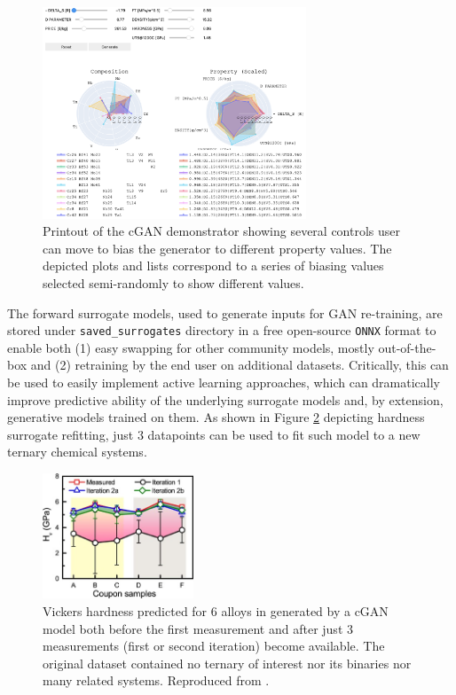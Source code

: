 \begin{figure}[H]
    \centering
    \includegraphics[width=0.7\textwidth]{inversedesign/cgan_demo.png}
    \caption{Printout of the cGAN demonstrator showing several controls user can move to bias the generator to different property values. The depicted plots and lists correspond to a series of biasing values selected semi-randomly to show different values.}
    \label{inverse:fig:cgandemo}
\end{figure}

The forward surrogate models, used to generate inputs for GAN re-training, are stored under \texttt{saved\_surrogates} directory in a free open-source \texttt{ONNX} format to enable both (1) easy swapping for other community models, mostly out-of-the-box and (2) retraining by the end user on additional datasets. Critically, this can be used to easily implement active learning approaches, which can dramatically improve predictive ability of the underlying surrogate models and, by extension, generative models trained on them. As shown in Figure \ref{inverse:fig:activelearn} depicting hardness surrogate refitting, just 3 datapoints can be used to fit such model to a new ternary chemical systems.

\begin{figure}[H]
    \centering
    \includegraphics[width=0.4\textwidth]{inversedesign/inverse_active.jpg}
    \caption{Vickers hardness predicted for 6  alloys in \cite{Li2024DesignExperiments} generated by a cGAN model both before the first measurement and after just 3 measurements (first or second iteration) become available. The original dataset contained no ternary of interest nor its binaries nor many related systems. Reproduced from \cite{Li2024DesignExperiments}.}
    \label{inverse:fig:activelearn}
\end{figure}







\printbibliography[heading=subbibintoc]